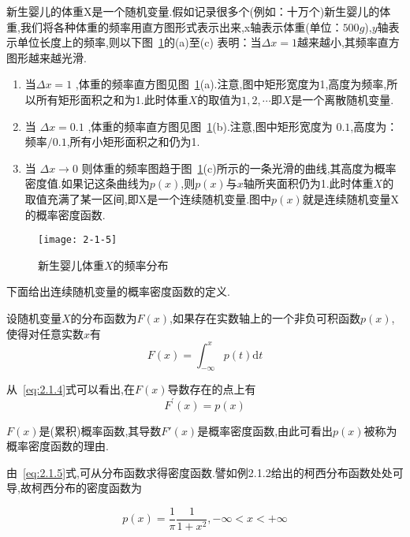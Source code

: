 \begin{example}
	新生婴儿的体重X是一个随机变量.假如记录很多个(例如：十万个)新生婴儿的体重,我们将各种体重的频率用直方图形式表示出来,x轴表示体重(单位：$ 500g $),$ y $轴表示单位长度上的频率,则以下图~\ref{fig:2-1-5}的(a)至(c)
	表明：当$\Delta x=1$越来越小,其频率直方图形越来越光滑.
	
	\begin{enumerate}
		\item 当$\Delta x=1$ ,体重的频率直方图见图~\ref{fig:2-1-5}(a).注意,图中矩形宽度为1,高度为频率,所以所有矩形面积之和为1.此时体重$ X $的取值为$1,2, \cdots $即$ X $是一个离散随机变量.
		\item 当 $\Delta x=0.1$ ,体重的频率直方图见图~\ref{fig:2-1-5}(b).注意,图中矩形宽度为
		$ 0.1 $,高度为：频率$ /0.1 $,所有小矩形面积之和仍为1.
		\item 当 $\Delta x \rightarrow 0$ 则体重的频率图趋于图~\ref{fig:2-1-5}(c)所示的一条光滑的曲线,其高度为概率密度值.如果记这条曲线为$ p(x) $,则$ p(x) $与$ x $轴所夹面积仍为1.此时体重$ X $的取值充满了某一区间,即X是一个连续随机变量.图中$ p(x) $就是连续随机变量X的概率密度函数.
	\end{enumerate}
	
\end{example}

\begin{figure}
	\centering
	\texttt{[image: 2-1-5]}
	\caption{新生婴儿体重$ X $的频率分布}
	\label{fig:2-1-5}
\end{figure}

下面给出连续随机变量的概率密度函数的定义.

\begin{definition}{}{}
	设随机变量$ X $的分布函数为$ F(x) $,如果存在实数轴上的一个非负可积函数$ p(x) $,使得对任意实数$ x $有
	\begin{equation} 
	F(x)=\int_{-\infty}^{x} p(t) \mathrm{d} t \label{eq:2.1.4}
	\end{equation}
	
	从~\ref{eq:2.1.4}式可以看出,在$ F(x) $导数存在的点上有
	\begin{equation} 
	F^{\prime}(x)=p(x) \label{eq:2.1.5}
	\end{equation}
	
	$ F(x) $是(累积)概率函数,其导数$ F'(x) $是概率密度函数,由此可看出$ p(x) $被称为概率密度函数的理由.
	
	由~\ref{eq:2.1.5}式,可从分布函数求得密度函数.譬如例2.1.2给出的柯西分布函数处处可导,故柯西分布的密度函数为
	
	\[ 
	p(x)=\frac{1}{\pi} \frac{1}{1+x^{2}},-\infty<x<+\infty
	\]
\end{definition}

